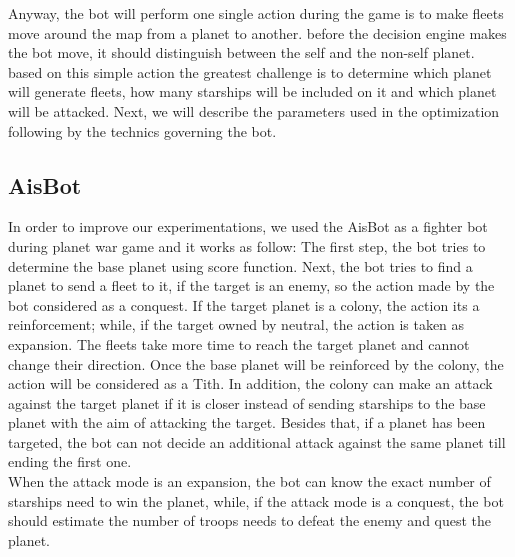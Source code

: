 \documentclass[]{interact}
\theoremstyle{plain}%
\theoremstyle{definition}
\theoremstyle{remark}
\begin{document}
Anyway, the bot will perform one single action during the game is to make fleets move around the map from a planet to another. before the decision engine makes the bot move, it should distinguish between the self and the non-self planet. based on this simple action the greatest challenge is to determine which planet will generate fleets, how many starships will be included on it and which planet will be attacked. Next, we will describe the parameters used in the optimization following by the technics governing the bot.




\subsection{AisBot}
In order to improve our experimentations, we used the AisBot as a fighter bot during planet war game and it works as follow: The first step, the bot tries to determine the base planet using score function. Next, the bot tries to find a planet to send a fleet to it, if the target is an enemy, so the action made by the bot considered as a conquest. If the target planet is a colony, the action its a reinforcement; while, if the target owned by neutral, the action is taken as expansion. The fleets take more time to reach the target planet and cannot change their direction. Once the base planet will be reinforced by the colony, the action will be considered as a Tith. In addition, the colony can make an attack against the target planet if it is closer instead of sending starships to the base planet with the aim of attacking the target. Besides that, if a planet has been targeted, the bot can not decide an additional attack against the same planet till ending the first one.\\

When the attack mode is an expansion, the bot can know the exact number of starships need to win the planet, while, if the attack mode is a conquest, the bot should estimate the number of troops needs to defeat the enemy and quest the planet.
\end{document}
